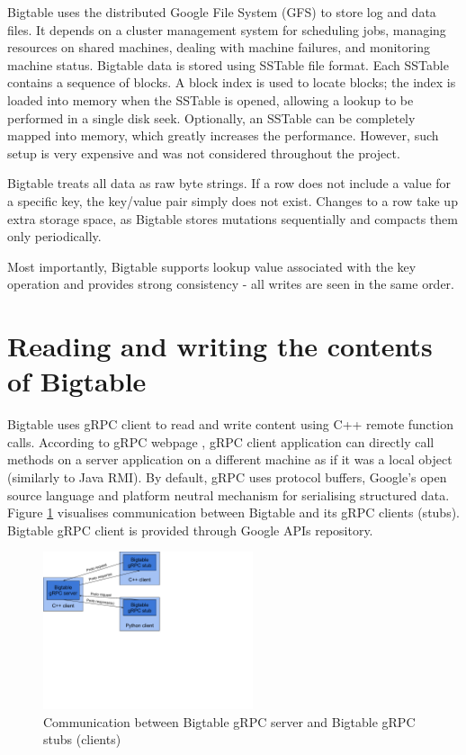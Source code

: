 \documentclass[bsc,frontabs,twoside,singlespacing,parskip,deptreport]{infthesis}     %
\begin{document}
Bigtable uses the distributed Google File System (GFS) to store log and data files. It depends on a cluster management system for scheduling jobs, managing resources on shared machines, dealing with machine failures, and monitoring machine status. Bigtable data is stored using SSTable file format. Each SSTable contains a sequence of blocks. A block index is used to locate blocks; the index is loaded into memory when the SSTable is opened, allowing a lookup to be performed in a single disk seek. Optionally, an SSTable can be completely mapped into memory, which greatly increases the performance. However, such setup is very expensive and was not considered throughout the project.

Bigtable treats all data as raw byte strings. If a row does not include a value for a specific key, the key/value pair simply does not exist. Changes to a row take up extra storage space, as Bigtable stores mutations sequentially and compacts them only periodically.

Most importantly, Bigtable supports lookup value associated with the key operation and provides strong consistency - all writes are seen in the same order.

\section{Reading and writing the contents of Bigtable}

Bigtable uses gRPC client to read and write content using C++ remote function calls. According to gRPC webpage \citep{grpc}, gRPC client application can directly call methods on a server application on a different machine as if it was a local object (similarly to Java RMI). By default, gRPC uses protocol buffers, Google's open source language and platform neutral mechanism for serialising structured data. Figure \ref{fig:grpc} visualises communication between Bigtable and its gRPC clients (stubs). Bigtable gRPC client is provided through Google APIs repository. 

\begin{figure}[H]
\centering
\includegraphics[width=0.55\textwidth]{images/grpc1}
\caption{Communication between Bigtable gRPC server and Bigtable gRPC stubs (clients)}
\label{fig:grpc}
\end{figure}
\end{document}
